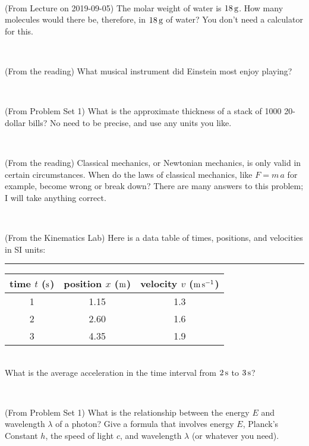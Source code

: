 \documentclass[12pt, letterpaper]{article}
\begin{document}
\vfill ~

\begin{problem} (From Lecture on 2019-09-05)
The molar weight of water is $18\,\mathrm{g}$. How many molecules would there
be, therefore, in $18\,\mathrm{g}$ of water? You don't need a calculator for
this.
\end{problem}


\vfill ~

\begin{problem} (From the reading)
What musical instrument did Einstein most enjoy playing?
\end{problem}


\vfill ~


\clearpage


\begin{problem} (From Problem Set 1)
What is the approximate thickness of a stack of 1000 20-dollar bills?
No need to be precise, and use any units you like.
\end{problem}


\vfill ~

\begin{problem} (From the reading)
Classical mechanics, or Newtonian mechanics, is only valid in certain
circumstances. When do the laws of classical mechanics, like $F =
m\,a$ for example, become wrong or break down? There are many answers
to this problem; I will take anything correct.
\end{problem}


\vfill ~

\begin{problem} (From the Kinematics Lab)
Here is a data table of times, positions, and velocities in SI units:\\
\rule{1.0in}{0pt}\begin{tabular}{c|c|c}
time $t$ ($\mathrm{s}$) & position $x$ ($\mathrm{m}$) & velocity $v$ ($\mathrm{m}\,\mathrm{s}^{-1}$) \\
\hline
1 & 1.15 & 1.3 \\
2 & 2.60 & 1.6 \\
3 & 4.35 & 1.9 \\
\hline
\end{tabular}\\
What is the average acceleration in the time interval from $2\,\mathrm{s}$ to $3\,\mathrm{s}$?
\end{problem}


\vfill ~

\begin{problem} (From Problem Set 1)
What is the relationship between the energy $E$ and wavelength
$\lambda$ of a photon? Give a formula that involves energy $E$,
Planck's Constant $h$, the speed of light $c$, and wavelength
$\lambda$ (or whatever you need).
\end{problem}
\end{document}
